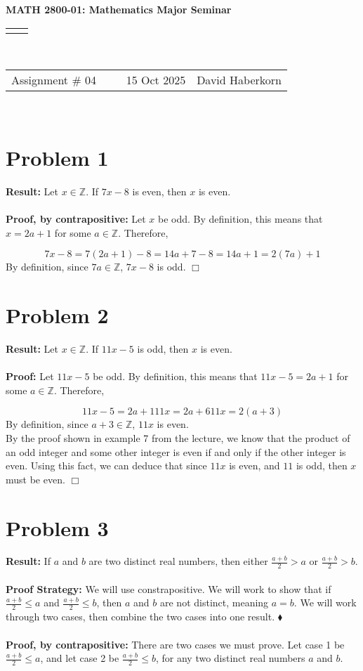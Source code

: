 \documentclass[11pt]{article}
\renewcommand{\title}[1]{\textbf{#1}\\}
\renewcommand{\line}{\begin{tabularx}{\textwidth}{X>{\raggedleft}X}\hline\\\end{tabularx}\\[-0.5cm]}
\newcommand{\leftright}[2]{\begin{tabularx}{\textwidth}{X>{\raggedleft}X}#1%
& #2\\\end{tabularx}\\[-0.5cm]}
\begin{document}
\title{MATH 2800-01: Mathematics Major Seminar}
\line
\leftright{Assignment \# 04 ~~~~ 15 Oct 2025}{David Haberkorn}


\section*{Problem 1}

    \textbf{Result:} Let $x \in \mathbb{Z}$. If $7x-8$ is even, then $x$ is even.\\
    \\
    \textbf{Proof, by contrapositive:} Let $x$ be odd. By definition, this means that $x = 2a + 1$ for some $a \in \mathbb{Z}$. Therefore,

    $$ 
    7x-8 = 7(2a+1)-8 = 14a+7-8 = 14a+1 = 2(7a)+1
    $$
    By definition, since $7a \in \mathbb{Z}$, $7x-8$ is odd. \hfill $\Box$


\newpage

\section*{Problem 2}

    \textbf{Result:} Let $x \in \mathbb{Z}$. If $11x-5$ is odd, then $x$ is even.\\
    \\
    \textbf{Proof:} Let $11x-5$ be odd. By definition, this means that $11x-5 = 2a + 1$ for some $a \in \mathbb{Z}$. Therefore,

    $$
        11x-5=2a+1
        11x=2a+6
        11x=2(a+3)
    $$
    By definition, since $a+3 \in \mathbb{Z}$, $11x$ is even. \\
    By the proof shown in example 7 from the lecture, we know that the product of an odd integer and some other integer is even if and only if the other integer is even. Using this fact, we can deduce that since $11x$ is even, and $11$ is odd, then $x$ must be even. \hfill $\Box$


\newpage

\section*{Problem 3}

    \textbf{Result:} If $a$ and $b$ are two distinct real numbers, then either $\frac{a+b}{2} > a$ or $\frac{a+b}{2}>b$.\\
    \\
    \textbf{Proof Strategy:} We will use constrapositive. We will work to show that if $\frac{a+b}{2} \leq a$ and $\frac{a+b}{2} \leq b$, then $a$ and $b$ are not distinct, meaning $a=b$. We will work through two cases, then combine the two cases into one result. \hfill $\blacklozenge$\\
    \\
    \textbf{Proof, by contrapositive:} There are two cases we must prove. Let case 1 be $\frac{a+b}{2} \leq a$, and let case 2 be $\frac{a+b}{2} \leq b$, for any two distinct real numbers $a$ and $b$.
\end{document}
